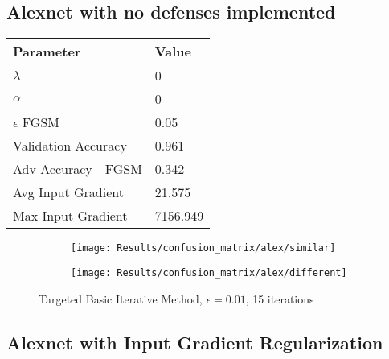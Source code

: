 \documentclass[draft,final]{vutinfth} %
\begin{document}
\subsection{Alexnet with no defenses implemented}

\begin{table}[h]
  \centering
  \begin{tabular}{ll}
    \toprule
			Parameter			& Value   \\
    \midrule
			$\lambda$								& 0				\\
			$\alpha$								& 0				\\
			$\epsilon$ FGSM					& 0.05		\\
			
			Validation Accuracy			& 0.961		\\ %
			Adv Accuracy - FGSM			& 0.342		\\
			
			Avg Input Gradient			& 21.575	\\
			Max Input Gradient			& 7156.949\\
    \bottomrule
  \end{tabular}
\end{table}


\begin{figure}[h]
  \begin{subfigure}[b]{0.75\columnwidth}
		\centering
    \texttt{[image: Results/confusion\_matrix/alex/similar]}%
    \label{fig:exp:cm:alex:similar}
  \end{subfigure}
  \begin{subfigure}[b]{0.75\columnwidth}
		\centering
    \texttt{[image: Results/confusion\_matrix/alex/different]}
    \label{fig:exp:cm:alex:different}
  \end{subfigure}
  \caption{Targeted Basic Iterative Method, $\epsilon = 0.01$, 15 iterations}
  \label{fig:intro} %
\end{figure}

\subsection{Alexnet with Input Gradient Regularization}
\end{document}
